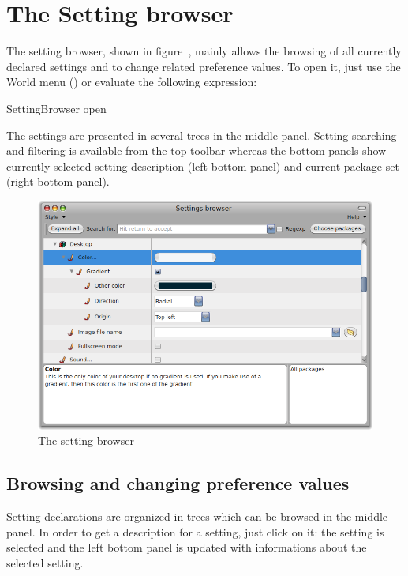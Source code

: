 \documentclass[a4paper,10pt,twoside]{book}
\begin{document}
\section{The Setting browser}
\label{sec:TheSettingBrowser}
The setting browser, shown in figure~, mainly allows the browsing of all currently declared settings and to change related preference values. To open it, just use the World menu () or evaluate the following expression:
\begin{code}{}
SettingBrowser open
\end{code}
The settings are presented in several trees in the middle panel. Setting searching and filtering is available from the top toolbar whereas the bottom panels show currently selected setting description (left bottom panel) and current package set (right bottom panel). 
\begin{figure}[tbh]
\begin{center}
\includegraphics[scale=0.3]{SettingBrowser}
\caption{The setting browser}
\end{center}
\end{figure}

\subsection{Browsing and changing preference values}
Setting declarations are organized in trees which can be browsed in the middle panel. In order to get a description for a setting, just click on it: the setting is selected and the left bottom panel is updated with informations about the selected setting. 
\end{document}
